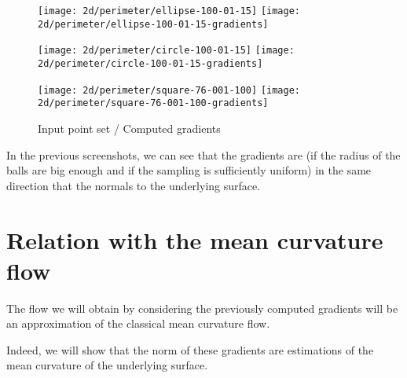 \begin{figure}[H]
    \centering

    \begin{minipage}{0.8\linewidth}
        \centering
        \texttt{[image: 2d/perimeter/ellipse-100-01-15]}
        \texttt{[image: 2d/perimeter/ellipse-100-01-15-gradients]}
        \label{fig:gradients_perimeter_2d_ellipse}
    \end{minipage}

    \begin{minipage}{0.8\linewidth}
        \centering
        \texttt{[image: 2d/perimeter/circle-100-01-15]}
        \texttt{[image: 2d/perimeter/circle-100-01-15-gradients]}
        \label{fig:gradients_perimeter_2d_circle}
    \end{minipage}

    \begin{minipage}{0.8\linewidth}
        \centering
        \texttt{[image: 2d/perimeter/square-76-001-100]}
        \texttt{[image: 2d/perimeter/square-76-001-100-gradients]}
        \label{fig:gradients_perimeter_2d_square}
    \end{minipage}

    \caption{Input point set / Computed gradients}
    \label{fig:gradients_perimeter_2d}
\end{figure}

In the previous screenshots, we can see that the gradients are (if the radius of
the balls are big enough and if the sampling is sufficiently uniform) in the
same direction that the normals to the underlying surface.


\section{Relation with the mean curvature flow}

The flow we will obtain by considering the previously computed gradients will be
an approximation of the classical mean curvature flow.

Indeed, we will show that the norm of these gradients are estimations of the
mean curvature of the underlying surface.


